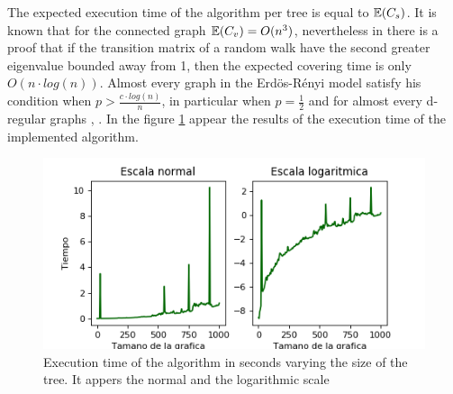 The expected execution time of the algorithm per tree is equal to $\mathbb{E}(C_{s})$. It is known that for the connected graph $\mathbb{E}(C_{v}) = O(n^{3})$, nevertheless in \cite{BS89} there is a proof that if the transition matrix of a random walk have the second greater eigenvalue bounded away from 1, then the expected covering time is only $O(n\cdot log(n))$. Almost every graph in the Erdös-Rényi model satisfy his condition when $p > \frac{c\cdot log(n)}{n}$, in particular when $p=\frac{1}{2}$ and for almost every d-regular graphs \cite{BS87}, \cite{FKS89}. 
In the figure \ref{fig:tiemposGEN} appear the results of the execution time of the implemented algorithm.
\begin{figure}[h!]
	\centering
	\includegraphics[scale=0.8]{Python/Figures/Time-generate.png}
	\caption{ Execution time of the algorithm in seconds varying the size of the tree. It appers the normal and the logarithmic scale}
	\label{fig:tiemposGEN}
\end{figure}
